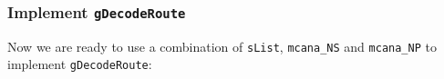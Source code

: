 \begin{Shaded}
\begin{Highlighting}[]
\NormalTok{  (}\OtherTok{=\textgreater{}}
\OtherTok{{-}\textgreater{}}
\NormalTok{  (}\OtherTok{=\textgreater{}}\OperatorTok{:}\OtherTok{{-}\textgreater{}} \OtherTok{{-}\textgreater{}}
\OtherTok{{-}\textgreater{}}
  \NormalTok{ (}
\OtherTok{=}
 \NormalTok{ (}\OtherTok{=\textgreater{}} \OtherTok{{-}\textgreater{}}\OtherTok{{-}\textgreater{}} \NormalTok{ (}
\NormalTok{ \_ }\OtherTok{=}  
\OtherTok{=} 
\OtherTok{\textless{}{-}}
\OtherTok{\textless{}{-}}
       \OperatorTok{$}\OperatorTok{:*}
\end{Highlighting}
\end{Shaded}

\hypertarget{implement-gdecoderoute}{%
\subsubsection{\texorpdfstring{Implement
\texttt{gDecodeRoute}}{Implement gDecodeRoute}}\label{implement-gdecoderoute}}

Now we are ready to use a combination of \texttt{sList},
\texttt{mcana\_NS} and \texttt{mcana\_NP} to implement
\texttt{gDecodeRoute}:

